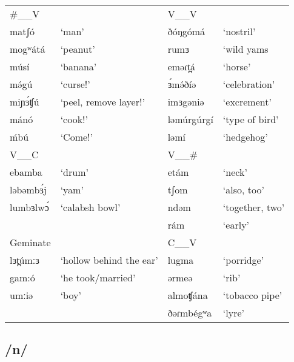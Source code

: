 \ea
\begin{tabular}[t]{llll}
\#\_\_V	&&	V\_\_V		\\
matʃó	&‘man’			&ðóŋgómá	&‘nostril’\\
mogʷátá	&‘peanut’		&rumɜ		&‘wild yams\\
músí	&‘banana’		&eməɾt̪á		&‘horse’\\
mə́gú		&‘curse!’		&ɜ́mə́ðíə		&‘celebration’\\
miɲɜ́ʧú	&‘peel, remove layer!’		&imɜgəniə	&‘excrement’\\
mánó	&‘cook!’		&ləmúrgúrgí	&‘type of bird’\\
ḿbú		&‘Come!’		&ləmí		&‘hedgehog’\\
\midrule	
V\_\_C		&& V\_\_\# 	\\
\midrule
ebamba		&‘drum’		&etám	&‘neck’\\
ləbəmbɜ́j	&‘yam’		&tʃom	&‘also, too’\\
lumbɜlwɔ́	&‘calabsh bowl’		&ndəm	&‘together, two’\\
						&&rám	&‘early’\\
\midrule
Geminate	&&		C\_\_V	\\
\midrule
lɜt̪úmːɜ	&‘hollow behind the ear’		&lugma		&‘porridge’\\
gam:ó	&‘he took/married’			&ərmeə		&‘rib’\\
umːiə	&‘boy’						&almoʧána	&‘tobacco pipe’\\
							&&ðəɾmbégʷa	&‘lyre’
\end{tabular}\label{ex:ch2:31}
\z 

\subsection{/n/}

